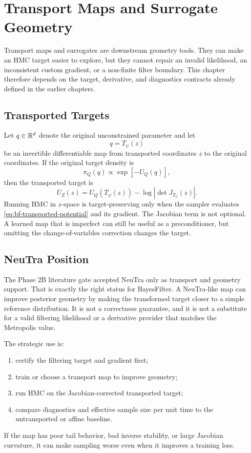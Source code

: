 \chapter{Transport Maps and Surrogate Geometry}
\label{ch:bf-transport-surrogates}

Transport maps and surrogates are downstream geometry tools.  They can make an
HMC target easier to explore, but they cannot repair an invalid likelihood,
an inconsistent custom gradient, or a non-finite filter boundary.  This chapter
therefore depends on the target, derivative, and diagnostics contracts already
defined in the earlier chapters.

\section{Transported Targets}
\label{sec:bf-transported-targets}

Let $q\in\mathbb{R}^d$ denote the original unconstrained parameter and let
\[
  q = T_\psi(z)
\]
be an invertible differentiable map from transported coordinates $z$ to the
original coordinates.  If the original target density is
\[
  \pi_Q(q) \propto \exp[-U_Q(q)],
\]
then the transported target is
\begin{equation}
\label{eq:bf-transported-potential}
  U_Z(z)
  =
  U_Q(T_\psi(z))
  -
  \log\left|\det J_{T_\psi}(z)\right| .
\end{equation}
Running HMC in $z$-space is target-preserving only when the sampler evaluates
\eqref{eq:bf-transported-potential} and its gradient.  The Jacobian term is not
optional.  A learned map that is imperfect can still be useful as a
preconditioner, but omitting the change-of-variables correction changes the
target.

\section{NeuTra Position}
\label{sec:bf-neutra-position}

The Phase 2B literature gate accepted NeuTra only as transport and geometry
support.  That is exactly the right status for BayesFilter.  A NeuTra-like map
can improve posterior geometry by making the transformed target closer to a
simple reference distribution.  It is not a correctness guarantee, and it is
not a substitute for a valid filtering likelihood or a derivative provider
that matches the Metropolis value.

The strategic use is:
\begin{enumerate}[label=(\roman*)]
  \item certify the filtering target and gradient first;
  \item train or choose a transport map to improve geometry;
  \item run HMC on the Jacobian-corrected transported target;
  \item compare diagnostics and effective sample size per unit time to the
    untransported or affine baseline.
\end{enumerate}
If the map has poor tail behavior, bad inverse stability, or large Jacobian
curvature, it can make sampling worse even when it improves a training loss.

